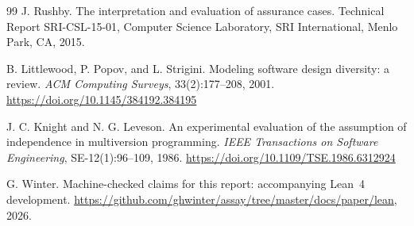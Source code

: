 \begin{thebibliography}{99}
J. Rushby.
\newblock The interpretation and evaluation of assurance cases.
\newblock Technical Report SRI-CSL-15-01, Computer Science Laboratory, SRI
International, Menlo Park, CA, 2015.

B. Littlewood, P. Popov, and L. Strigini.
\newblock Modeling software design diversity: a review.
\newblock \emph{ACM Computing Surveys}, 33(2):177--208, 2001.
\newblock \url{https://doi.org/10.1145/384192.384195}

J. C. Knight and N. G. Leveson.
\newblock An experimental evaluation of the assumption of independence in
multiversion programming.
\newblock \emph{IEEE Transactions on Software Engineering}, SE-12(1):96--109,
1986.
\newblock \url{https://doi.org/10.1109/TSE.1986.6312924}

G. Winter.
\newblock Machine-checked claims for this report: accompanying Lean~4
development.
\newblock \url{https://github.com/ghwinter/assay/tree/master/docs/paper/lean},
2026.

\end{thebibliography}
